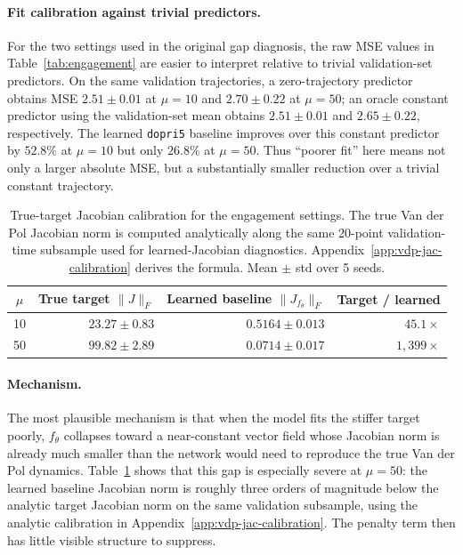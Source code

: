 \documentclass[11pt]{article}
\theoremstyle{plain}
\theoremstyle{definition}
\newcommand{\fjac}{J_{f_\theta}}
\begin{document}
\paragraph{Fit calibration against trivial predictors.}
For the two settings used in the original gap diagnosis, the raw MSE values
in Table~\ref{tab:engagement} are easier to interpret relative to trivial
validation-set predictors. On the same validation trajectories, a
zero-trajectory predictor obtains MSE $2.51 \pm 0.01$ at
$\mu = 10$ and $2.70 \pm 0.22$ at $\mu = 50$; an oracle constant predictor
using the validation-set mean obtains $2.51 \pm 0.01$ and $2.65 \pm 0.22$,
respectively. The learned \texttt{dopri5} baseline improves over this
constant predictor by $52.8\%$ at $\mu = 10$ but only $26.8\%$ at
$\mu = 50$. Thus ``poorer fit'' here means not only a larger absolute MSE,
but a substantially smaller reduction over a trivial constant trajectory.

\begin{table}[t]
\centering
\caption{True-target Jacobian calibration for the engagement settings. The
  true Van der Pol Jacobian norm is computed analytically along the same
  20-point validation-time subsample used for learned-Jacobian diagnostics.
  Appendix~\ref{app:vdp-jac-calibration} derives the formula. Mean $\pm$ std
  over 5 seeds.}
\label{tab:true-jac-calibration}
\begin{tabular}{c r r r}
\toprule
$\mu$ & True target $\|J\|_F$ & Learned baseline $\|\fjac\|_F$ & Target / learned \\
\midrule
10 & $23.27 \pm 0.83$ & $0.5164 \pm 0.013$ & $45.1\times$ \\
50 & $99.82 \pm 2.89$ & $0.0714 \pm 0.017$ & $1{,}399\times$ \\
\bottomrule
\end{tabular}
\end{table}

\paragraph{Mechanism.}
The most plausible mechanism is that when the model fits the stiffer target
poorly, $f_\theta$ collapses toward a near-constant vector field whose
Jacobian norm is already much smaller than the network would need to
reproduce the true Van der Pol dynamics. Table~\ref{tab:true-jac-calibration}
shows that this gap is especially severe at $\mu = 50$: the learned baseline
Jacobian norm is roughly three orders of magnitude below the analytic target
Jacobian norm on the same validation subsample, using the analytic calibration
in Appendix~\ref{app:vdp-jac-calibration}. The penalty term then has little
visible structure to suppress.
\end{document}
